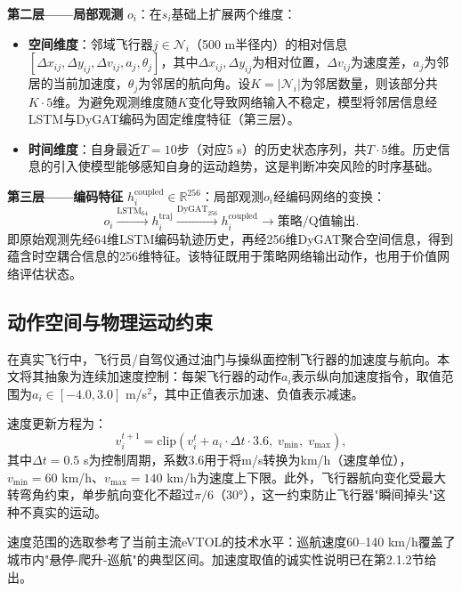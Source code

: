 \documentclass[12pt,a4paper,UTF8]{ctexbook}
\begin{document}
\textbf{第二层——局部观测} $o_i$：在$s_i$基础上扩展两个维度：
\begin{itemize}
    \item \textbf{空间维度}：邻域飞行器$j \in \mathcal{N}_i$（500 m半径内）的相对信息$[\Delta x_{ij}, \Delta y_{ij}, \Delta v_{ij}, a_j, \theta_j]$，其中$\Delta x_{ij},\Delta y_{ij}$为相对位置，$\Delta v_{ij}$为速度差，$a_j$为邻居的当前加速度，$\theta_j$为邻居的航向角。设$K=|\mathcal{N}_i|$为邻居数量，则该部分共$K\cdot5$维。为避免观测维度随$K$变化导致网络输入不稳定，模型将邻居信息经LSTM与DyGAT编码为固定维度特征（第三层）。
    \item \textbf{时间维度}：自身最近$T=10$步（对应5 s）的历史状态序列，共$T\cdot5$维。历史信息的引入使模型能够感知自身的运动趋势，这是判断冲突风险的时序基础。
\end{itemize}

\textbf{第三层——编码特征} $h_i^{\text{coupled}} \in \mathbb{R}^{256}$：局部观测$o_i$经编码网络的变换：
\begin{equation}
    o_i \xrightarrow{\text{LSTM}_{64}} h_i^{\text{traj}} \xrightarrow{\text{DyGAT}_{256}} h_i^{\text{coupled}} \rightarrow \text{策略/Q值输出}.
    \label{eq:encoding_chain}
\end{equation}
即原始观测先经64维LSTM编码轨迹历史，再经256维DyGAT聚合空间信息，得到蕴含时空耦合信息的256维特征。该特征既用于策略网络输出动作，也用于价值网络评估状态。

\subsection{动作空间与物理运动约束}

在真实飞行中，飞行员/自驾仪通过油门与操纵面控制飞行器的加速度与航向。本文将其抽象为连续加速度控制：每架飞行器的动作$a_i$表示纵向加速度指令，取值范围为$a_i \in [-4.0, 3.0]$ m/s$^2$，其中正值表示加速、负值表示减速。

速度更新方程为：
\begin{equation}
    v_i^{t+1} = \text{clip}\!\left(v_i^{t} + a_i \cdot \Delta t \cdot 3.6,\; v_{\min},\; v_{\max}\right),
    \label{eq:velocity_update}
\end{equation}
其中$\Delta t=0.5$ s为控制周期，系数3.6用于将m/s转换为km/h（速度单位），$v_{\min}=60$ km/h、$v_{\max}=140$ km/h为速度上下限。此外，飞行器航向变化受最大转弯角约束，单步航向变化不超过$\pi/6$（30°），这一约束防止飞行器"瞬间掉头"这种不真实的运动。

速度范围的选取参考了当前主流eVTOL的技术水平：巡航速度60--140 km/h覆盖了城市内"悬停-爬升-巡航"的典型区间。加速度取值的诚实性说明已在第2.1.2节给出。
\end{document}
